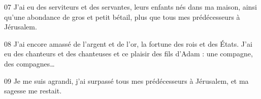 
07 J’ai eu des serviteurs et des servantes, leurs enfants nés dans ma maison, ainsi qu’une abondance de gros et petit bétail, plus que tous mes prédécesseurs à Jérusalem.

08 J’ai encore amassé de l’argent et de l’or, la fortune des rois et des États. J’ai eu des chanteurs et des chanteuses et ce plaisir des fils d’Adam : une compagne, des compagnes…

09 Je me suis agrandi, j’ai surpassé tous mes prédécesseurs à Jérusalem, et ma sagesse me restait.
